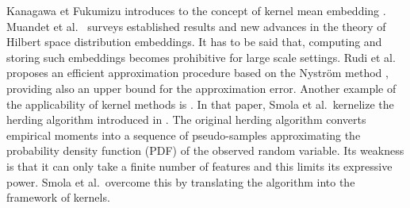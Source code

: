 Kanagawa et Fukumizu introduces to the concept of kernel mean embedding \cite{pmlr}. Muandet et al.\ \cite{Muandet_2017} surveys established results and new advances in the theory of Hilbert space distribution embeddings. 
It has to be said that, computing and storing such embeddings becomes prohibitive for large scale settings. Rudi et al.\ \cite{2022nystrom} proposes an efficient approximation procedure based on the Nyström method \cite{nystrom}, providing also an upper bound for the approximation error.
Another example of the applicability of kernel methods is \cite{supersamples}. In that paper, Smola et al.\ kernelize the herding algorithm introduced in \cite{welling2009herding,welling2009herding,Welling2010}. The original herding algorithm converts empirical moments into a sequence of pseudo-samples approximating the probability density function (PDF) of the observed random variable. Its weakness is that it can only take a finite number of features and this limits its expressive power.
Smola et al.\ overcome this by translating the algorithm into the framework of kernels.


